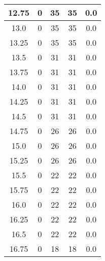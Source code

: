 \documentclass[letterpaper, 12pt]{article}
\begin{document}
\begin{longtable}{|c|c|c|c|c|}
\hline
12.75 & 0 & 35 & 35 & 0.0 \\
\hline
13.0 & 0 & 35 & 35 & 0.0 \\
\hline
13.25 & 0 & 35 & 35 & 0.0 \\
\hline
13.5 & 0 & 31 & 31 & 0.0 \\
\hline
13.75 & 0 & 31 & 31 & 0.0 \\
\hline
14.0 & 0 & 31 & 31 & 0.0 \\
\hline
14.25 & 0 & 31 & 31 & 0.0 \\
\hline
14.5 & 0 & 31 & 31 & 0.0 \\
\hline
14.75 & 0 & 26 & 26 & 0.0 \\
\hline
15.0 & 0 & 26 & 26 & 0.0 \\
\hline
15.25 & 0 & 26 & 26 & 0.0 \\
\hline
15.5 & 0 & 22 & 22 & 0.0 \\
\hline
15.75 & 0 & 22 & 22 & 0.0 \\
\hline
16.0 & 0 & 22 & 22 & 0.0 \\
\hline
16.25 & 0 & 22 & 22 & 0.0 \\
\hline
16.5 & 0 & 22 & 22 & 0.0 \\
\hline
16.75 & 0 & 18 & 18 & 0.0 \\
\hline
\end{longtable}
\end{document}
